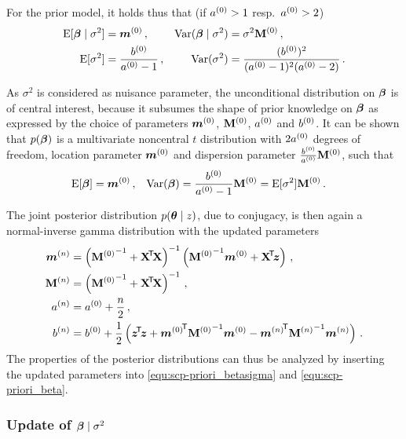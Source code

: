 For the prior model, it holds thus that (if $a^{(0)} > 1$ resp.\ $a^{(0)} > 2$)
\begin{align}
\begin{aligned}
\operatorname{E}[\boldsymbol{\beta}\mid\sigma^2] &= {\bm m}^{(0)} \,,                  & \operatorname{Var}(\boldsymbol{\beta}\mid\sigma^2) &= \sigma^2  \mathbf{M}^{(0)} \,, \\
\operatorname{E}[\sigma^2]           &= \frac{b^{(0)}}{a^{(0)} - 1} \,,  & \operatorname{Var}(\sigma^2)           &= \frac{(b^{(0)})^2}{(a^{(0)} - 1)^2 (a^{(0)} - 2)}\,.
\end{aligned}
\label{equ:scp-priori_betasigma}
\end{align}

As $\sigma^2$ is considered as nuisance parameter, the unconditional distribution
on $\boldsymbol{\beta}$ is of central interest, because it subsumes the shape of prior knowledge on $\boldsymbol{\beta}$
as expressed by the choice of parameters ${\bm m}^{(0)}$, $\mathbf{M}^{(0)}$, $a^{(0)}$ and $b^{(0)}$.
It can be shown that $p(\boldsymbol{\beta})$ is a multivariate noncentral $t$ distribution
with $2a^{(0)}$ degrees of freedom, location parameter ${\bm m}^{(0)}$ and dispersion parameter $\frac{b^{(0)}}{a^{(0)}} \mathbf{M}^{(0)}$,
such that
\begin{align}
\operatorname{E}[\boldsymbol{\beta}] &= {\bm m}^{(0)} \,, &  \operatorname{Var}(\boldsymbol{\beta}) &= \frac{b^{(0)}}{a^{(0)} - 1} \mathbf{M}^{(0)} = \operatorname{E}[\sigma^2] \mathbf{M}^{(0)}\,.
\label{equ:scp-priori_beta}
\end{align}

The joint posterior distribution $p(\boldsymbol{\theta}\mid z)$, due to conjugacy, is then
again a normal-inverse gamma distribution with the updated parameters
\begin{align*}
\mn &= \left( {\Mz}^{-1} + \XtX \right)^{-1} \left( {\Mz}^{-1} \mz + \Xtz \right) \,, \\
\Mn &= \left( {\Mz}^{-1} + \XtX \right)^{-1} \,, \\
\an &= \az + \frac{n}{2} \,, \\ %
\bn &= \bz + \frac{1}{2} \left( \ztz + {\mz}^\tra {\Mz}^{-1} \mz  - {\mn}^\tra {\Mn}^{-1} \mn \right) \,.
\end{align*}
The properties of the posterior distributions can thus be analyzed
by inserting the updated parameters into \eqref{equ:scp-priori_betasigma}
and \eqref{equ:scp-priori_beta}.


\subsubsection{Update of \texorpdfstring{$\boldsymbol{\beta}\mid\sigma^2$}{beta|sigma2}}
\label{sec:scp-update1}

